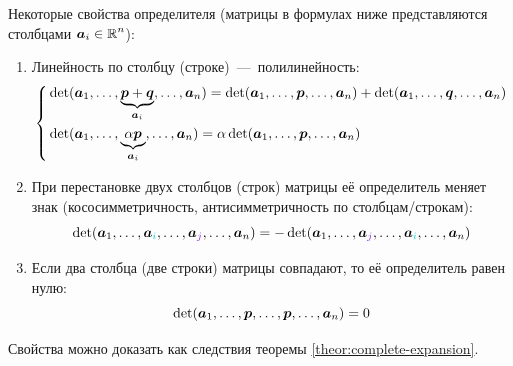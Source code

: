 \documentclass[a4paper,12pt]{article}
\begin{document}
  \begin{theorem}
    Некоторые свойства определителя (матрицы в формулах ниже представляются столбцами $\bds a_i \hm\in \RR^n$):
    \begin{enumerate}
      \item Линейность по столбцу (строке)~---~полилинейность:
        \begin{equation}\label{eq:poly-linearity}
          \left\{
            \begin{aligned}
              &\det (\boldsymbol a_1, \ldots, \underbrace{\boldsymbol p + \boldsymbol q}_{\boldsymbol a_i}, \ldots, \boldsymbol a_n)
                = \det (\boldsymbol a_1, \ldots, \boldsymbol p, \ldots, \boldsymbol a_n)
                + \det (\boldsymbol a_1, \ldots, \boldsymbol q, \ldots, \boldsymbol a_n)\\
              &\det (\boldsymbol a_1, \ldots, \underbrace{\alpha \boldsymbol p}_{\boldsymbol a_i}, \ldots, \boldsymbol a_n)
                = \alpha \det (\boldsymbol a_1, \ldots, \boldsymbol p, \ldots, \boldsymbol a_n)
            \end{aligned}
          \right.
        \end{equation}
      \item При перестановке двух столбцов (строк) матрицы её определитель меняет знак (кососимметричность, антисимметричность по столбцам/строкам):
        \begin{equation}\label{eq:row-swap}
          \det (\bds a_1, \ldots, \bds a_{\textcolor{light-cyan}{i}}, \ldots, \bds a_{\textcolor{light-purple}{j}}, \ldots, \bds a_n)
          = -\det (\bds a_1, \ldots, \bds a_{\textcolor{light-purple}{j}}, \ldots, \bds a_{\textcolor{light-cyan}{i}}, \ldots, \bds a_n)
        \end{equation}
      \item Если два столбца (две строки) матрицы совпадают, то её определитель равен нулю:
        \begin{equation}\label{eq:same-rows}
          \det (\boldsymbol a_1, \ldots, \boldsymbol p, \ldots, \boldsymbol p, \ldots, \boldsymbol a_n) = 0
        \end{equation}
    \end{enumerate}
  \end{theorem}
  
  Свойства можно доказать как следствия теоремы \ref{theor:complete-expansion}.
  
\end{document}
